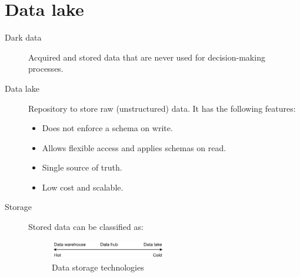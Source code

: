 \chapter{Data lake}

\begin{description}
    \item[Dark data] 
        Acquired and stored data that are never used for decision-making processes.

    \item[Data lake] 
        Repository to store raw (unstructured) data.
        It has the following features:
        \begin{itemize}
            \item Does not enforce a schema on write.
            \item Allows flexible access and applies schemas on read.
            \item Single source of truth.
            \item Low cost and scalable.
        \end{itemize}

    \item[Storage]
        Stored data can be classified as:

        \begin{figure}[H]
            \centering
            \includegraphics[width=0.5\textwidth]{img/_storage.pdf}
            \caption{Data storage technologies}
        \end{figure}
\end{description}


